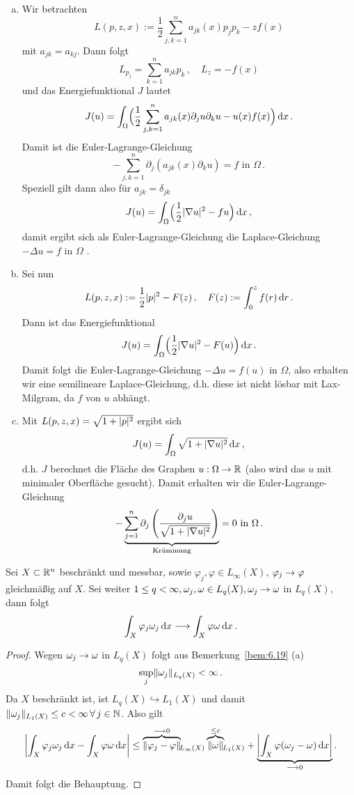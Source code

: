 \begin{bsp}
\begin{enumerate}[(a)]
\item Wir betrachten
\[
	L(p,z,x) := \frac 12\sum_{j,k=1}^n a_{jk} (x) p_j p_k - z f(x)
\]
mit $a_{jk} = a_{kj}$. Dann folgt
\[
	L_{p_j} = \sum_{k=1}^n a_{jk} p_k \, , \quad L_z = -f(x)
\]
und das Energiefunktional $J$ lautet
\[
	J(u)= \int_\Omega \Bigr( \frac 1 2 \sum_{j,k=1}^n a_{jk} (x) \partial_j u \partial_k u - u(x) f(x)\Bigr) \,\mathrm{d} x \, .
\]
Damit ist die Euler-Lagrange-Gleichung
\[
	-\sum_{j,k=1}^n \partial_j (a_{jk} (x) \partial_k u) = f \text{ in } \Omega \, .
\]
Speziell gilt dann also für $a_{jk} = \delta_{jk}$
\[
	J(u) = \int_\Omega \Bigr( \frac 12 \lvert \nabla u\rvert^2 - fu\Bigr) \,\mathrm{d} x \, , 
\]
damit ergibt sich als Euler-Lagrange-Gleichung die Laplace-Gleichung $-\Delta u = f$ in $\Omega$ .
\item Sei nun
\[
	L(p,z,x) := \frac 1 2 \lvert p\rvert^2 - F(z) \, , \quad F(z) := \int_0^z f(r) \,\mathrm{d} r \, .
\]
Dann ist das Energiefunktional
\[
	J(u) = \int_\Omega \Bigr(\frac 1 2 \lvert \nabla u\rvert^2 - F(u) \Bigr) \,\mathrm{d} x \, .
\]
Damit folgt die Euler-Lagrange-Gleichung $-\Delta u = f(u)$ in $\Omega$, also erhalten wir eine semilineare Laplace-Gleichung, d.h. diese ist nicht lösbar mit Lax-Milgram, da $f$ von $u$ abhängt.
\item Mit $L(p,z,x) = \sqrt{1+\lvert p\rvert^2}$ ergibt sich
\[
	J(u) = \int_\Omega \sqrt{1+\lvert \nabla u\rvert^2} \,\mathrm{d} x \, , 
\]
d.h. $J$ berechnet die Fläche des Graphen $u:\Omega \rightarrow \mathbb{R}$ (also wird das $u$ mit minimaler Oberfläche gesucht). Damit erhalten wir die Euler-Lagrange-Gleichung
\[
	-\underbrace{\sum_{j=1}^n \partial_j \left( \frac{\partial_j u}{\sqrt{1+\lvert \nabla u\rvert^2}}\right)}_{\text{Krümmung}} = 0 \text{ in } \Omega \, .
\]
\end{enumerate}
\end{bsp}

\begin{lemma}
\label{lemma:7.26}
Sei $X \subset \mathbb{R}^n$ beschränkt und messbar, sowie $\varphi_j, \varphi \in L_{\infty}(X)$, $\varphi_j \rightarrow \varphi$ gleichmäßig auf $X$. Sei weiter $1\leq q < \infty, \omega_j, \omega \in L_q(X), \omega_j \rightarrow \omega$ in $L_q(X)$, dann folgt
\[
	\int_X \varphi_j \omega_j \,\mathrm{d} x \longrightarrow \int_X \varphi \omega \,\mathrm{d} x \, .
\]
\end{lemma}

\begin{proof}
Wegen $\omega_j \rightarrow \omega$ in $L_q (X)$ folgt aus Bemerkung~\ref{bem:6.19} (a) $$\sup_j \lVert \omega_j\rVert_{L_q(X)}  <\infty \, .$$ Da $X$ beschränkt ist, ist $L_q(X) \hookrightarrow L_1(X)$ und damit $\lVert \omega_j\rVert_{L_1(X)} \leq c < \infty \, \forall \, j \in \mathbb{N}$. Also gilt
\begin{dmath*}
\Abs{\int_X \varphi_j \omega_j \d x - \int_X \varphi \omega \d x} \leq \overbrace{\norm{\varphi_j-\varphi}}^{\longrightarrow 0} \ \!\!\!\!_{L_\infty(X)}\overbrace{\norm\omega}^{\leq c} \!\!_{L_1(X)} + \underbrace{\Abs{\int_X \varphi(\omega_j-\omega) \d x}}_{\longrightarrow 0}  .
\end{dmath*}
Damit folgt die Behauptung.
\end{proof}

